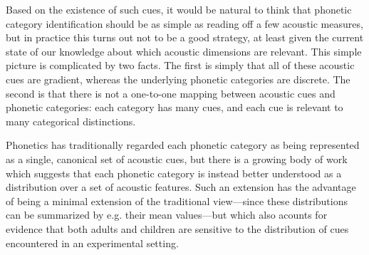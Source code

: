 \documentclass[12pt]{article}
\begin{document}
Based on the existence of such cues, it would be natural to think that phonetic category identification should be as simple as reading off a few acoustic measures, but in practice this turns out not to be a good strategy, at least given the current state of our knowledge about which acoustic dimensions are relevant.  This simple picture is complicated by two facts.  The first is simply that all of these acoustic cues are gradient, whereas the underlying phonetic categories are discrete.  The second is that there is not a one-to-one mapping between acoustic cues and phonetic categories: each category has many cues, and each cue is relevant to many categorical distinctions.  





Phonetics has traditionally regarded each phonetic category as being represented as a single, canonical set of acoustic cues, but there is a growing body of work which suggests that each phonetic category is instead better understood as a distribution over a set of acoustic features.  Such an extension has the advantage of being a minimal extension of the traditional view---since these distributions can be summarized by e.g. their mean values---but which also acounts for evidence that both adults and children are sensitive to the distribution of cues encountered in an experimental setting.  
\end{document}
